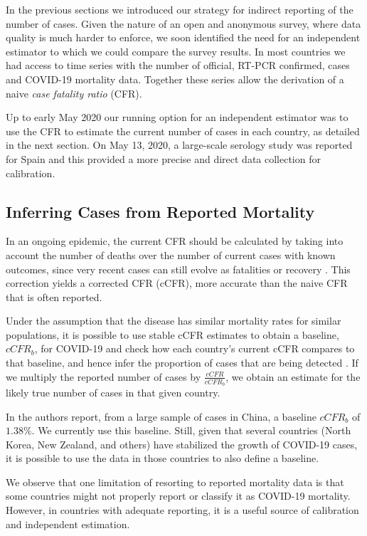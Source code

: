 \documentclass[sigconf,authordraft]{acmart}
\begin{document}
In the previous sections we introduced our strategy for indirect reporting of the number of cases. Given the nature of an open and anonymous survey, where data quality is much harder to enforce, we soon identified the need for an independent estimator to which we could compare the survey results. In most countries we had access to time series with the number of official, RT-PCR confirmed, cases and COVID-19 mortality data. Together these series allow the derivation of a naive \emph{case fatality ratio} (CFR). 

Up to early May 2020 our running option for an independent estimator was to use the CFR to estimate the current number of cases in each country, as detailed in the next section. On May 13, 2020, a large-scale serology study was reported for Spain \cite{ENEcovid19} and this provided a more precise and direct data collection for calibration. 

\subsection{Inferring Cases from Reported Mortality}

In an ongoing epidemic, the current CFR should be calculated by taking into account the number of deaths over the number of current cases with known outcomes, since very recent cases can still evolve as fatalities or recovery \cite{nishiura2009early}. This correction yields a corrected CFR (cCFR), more accurate than the naive CFR that is often reported. 

Under the assumption that the disease has similar mortality rates for similar populations, it is possible to use stable cCFR estimates to obtain a baseline, $\textit{cCFR}_b$, for COVID-19 and check how each country's current cCFR compares to that baseline, and hence infer the proportion of cases that are being detected \cite{russel2020using}. If we multiply the reported number of cases by $\frac{\textit{cCFR}}{\textit{cCFR}_b}$, we obtain an estimate for the likely true number of cases in that given country. 

In \cite{Verity2020} the authors report, from a large sample of cases in China, a baseline $\textit{cCFR}_b$ of $1.38\%$. We currently use this baseline. Still, given that several countries (North Korea, New Zealand, and others) have stabilized the growth of COVID-19 cases, it is possible to use the data in those countries to also define a baseline.

We observe that one limitation of resorting to reported mortality data is that some countries might not properly report or classify it as COVID-19 mortality. However, in countries with adequate reporting, it is a useful source of calibration and independent estimation.
\end{document}

